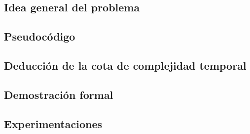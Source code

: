 \subsection{Idea general del problema}

\subsection{Pseudocódigo}



\subsection{Deducción de la cota de complejidad temporal}

\subsection{Demostración formal}
\subsection{Experimentaciones}